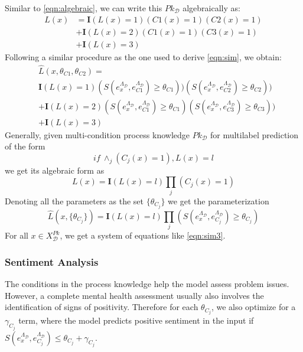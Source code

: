 \documentclass[letterpaper]{article} %
\begin{document}
Similar to \eqref{eqn:algebraic}, we can write this $Pk_{\mathcal{D}}$ algebraically as:
\begin{equation}\label{eqn:algebraic2}
\begin{split}
L(x) &= \mathbf{I}(L(x)=1)(C1(x)=1)(C2(x)=1) \\
& + \mathbf{I}(L(x)=2)(C1(x)=1)(C3(x)=1) \\
& + \mathbf{I}(L(x)=3)
\end{split}
\end{equation}
Following a similar procedure as the one used to derive \eqref{eqn:sim}, we obtain:
\begin{equation}\label{eqn:sim2}
\begin{split}
& \hat{L}(x, \theta_{C1},\theta_{C2}) = \\
& \mathbf{I}(L(x)=1)(S(e^{\Lambda_{\mathcal{D}}}_x, e^{\Lambda_{\mathcal{D}}}_{C1}) \geq \theta_{C1})) (S(e^{\Lambda_{\mathcal{D}}}_x, e^{\Lambda_{\mathcal{D}}}_{C2}) \geq \theta_{C2})) \\
& + \mathbf{I}(L(x)=2)(S(e^{\Lambda_{\mathcal{D}}}_x, e^{\Lambda_{\mathcal{D}}}_{C1}) \geq \theta_{C1})(S(e^{\Lambda_{\mathcal{D}}}_x, e^{\Lambda_{\mathcal{D}}}_{C3}) \geq \theta_{C3})) \\
& + \mathbf{I}(L(x)=3)
\end{split}
\end{equation}
Generally, given multi-condition process knowledge $Pk_{\mathcal{D}}$ for multilabel prediction of the form
\[if~\land_j(C_j(x)=1), L(x) = l\]
we get its algebraic form as
\begin{equation}\label{sim:algebraic3}
    L(x) = \mathbf{I}(L(x)=l)\prod_j(C_j(x)=1)
\end{equation}
Denoting all the parameters as the set $\{\theta_{C_j}\}$ we get the parameterization
\begin{equation}\label{eqn:sim3}
    \hat{L}(x, \{\theta_{C_j}\}) = \mathbf{I}(L(x)=l)\prod_j(S(e^{\Lambda_{\mathcal{D}}}_x, e^{\Lambda_{\mathcal{D}}}_{C_j}) \geq \theta_{C_j})
\end{equation}
For all $x \in X^{Pk}_{\mathcal{D}}$, we get a system of equations like \eqref{eqn:sim3}. 
\subsubsection{Sentiment Analysis}
The conditions in the process knowledge help the model assess problem issues. However, a complete mental health assessment usually also involves the identification of signs of positivity. Therefore for each $\theta_{C_j}$, we also optimize for a $\gamma_{C_j}$ term, where the model predicts positive sentiment in the input if $S(e^{\Lambda_{\mathcal{D}}}_x, e^{\Lambda_{\mathcal{D}}}_{C_j}) \leq \theta_{C_j} + \gamma_{C_j}$.
\end{document}
